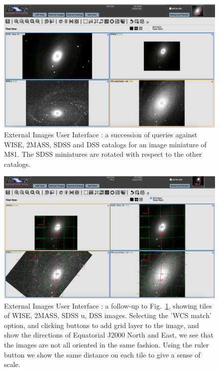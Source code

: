 \documentclass[DM,lsstdraft,toc]{lsstdoc}
\begin{document}
\begin{figure}
\includegraphics[width=\textwidth]{figs/external_images_m81_query.png}
\caption{External Images User Interface : a succession of queries against WISE, 2MASS, SDSS and DSS catalogs for an image miniature of M81. The SDSS miniatures are rotated with respect to the other catalogs. }
\label{fig:ext_images_m81}
\end{figure}

\begin{figure}
\includegraphics[width=\textwidth]{figs/external_images_m81_query_wcs.png}
\caption{External Images User Interface : a follow-up to Fig.~\ref{fig:ext_images_m81}, showing tiles of WISE, 2MASS, SDSS u, DSS images. Selecting  the 'WCS match' option, and clicking buttons to add grid layer to the image, and show the directions of Equatorial J2000 North and East, we see that the images are not all oriented in the same fashion. Using the ruler button we show the same distance on each tile to give a sense of scale.}
\label{fig:ext_images_m81_wcs}
\end{figure}
\end{document}
